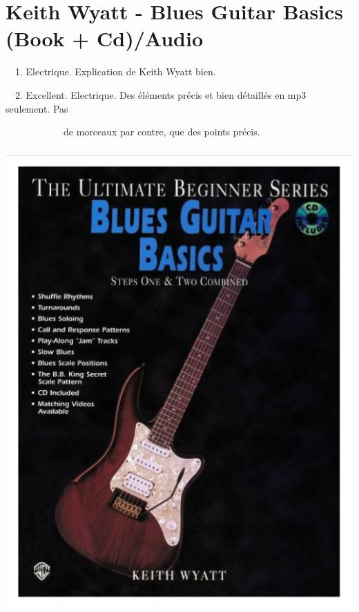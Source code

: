 \documentclass[a4paper]{book}
\begin{document}
\clearpage\section[Keith Wyatt {}- Blues Guitar Basics (Book +
Cd)/Audio]{Keith Wyatt - Blues Guitar Basics (Book + Cd)/Audio}
\hypertarget{RefHeadingToc168973218262}{}\ \  1. Electrique. Explication
de Keith Wyatt bien.

\ \  2. Excellent. Electrique. Des \'el\'ements pr\'ecis et bien
d\'etaill\'es en mp3 seulement. Pas

\ \ \ \ \ \ \ \ \ \ \ \ de morceaux par contre, que des points pr\'ecis.



\begin{center}
\includegraphics[width=13.757cm,height=17.829cm]{lebluessupportsmethodes-img113.png}
\end{center}
\end{document}
